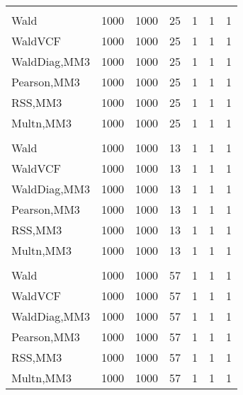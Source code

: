 \documentclass[
]{article}
\begin{document}
\begin{table}[H]
{\begin{tabular}[t]{lrrrrrr}
\addlinespace[0.3em]
\multicolumn{7}{l}{\textbf{1F 15V}}\\
\hspace{1em}Wald & 1000 & 1000 & 25 & 1 & 1 & 1\\
\hspace{1em}WaldVCF & 1000 & 1000 & 25 & 1 & 1 & 1\\
\hspace{1em}WaldDiag,MM3 & 1000 & 1000 & 25 & 1 & 1 & 1\\
\hspace{1em}Pearson,MM3 & 1000 & 1000 & 25 & 1 & 1 & 1\\
\hspace{1em}RSS,MM3 & 1000 & 1000 & 25 & 1 & 1 & 1\\
\hspace{1em}Multn,MM3 & 1000 & 1000 & 25 & 1 & 1 & 1\\
\addlinespace[0.3em]
\multicolumn{7}{l}{\textbf{2F 10V}}\\
\hspace{1em}Wald & 1000 & 1000 & 13 & 1 & 1 & 1\\
\hspace{1em}WaldVCF & 1000 & 1000 & 13 & 1 & 1 & 1\\
\hspace{1em}WaldDiag,MM3 & 1000 & 1000 & 13 & 1 & 1 & 1\\
\hspace{1em}Pearson,MM3 & 1000 & 1000 & 13 & 1 & 1 & 1\\
\hspace{1em}RSS,MM3 & 1000 & 1000 & 13 & 1 & 1 & 1\\
\hspace{1em}Multn,MM3 & 1000 & 1000 & 13 & 1 & 1 & 1\\
\addlinespace[0.3em]
\multicolumn{7}{l}{\textbf{3F 15V}}\\
\hspace{1em}Wald & 1000 & 1000 & 57 & 1 & 1 & 1\\
\hspace{1em}WaldVCF & 1000 & 1000 & 57 & 1 & 1 & 1\\
\hspace{1em}WaldDiag,MM3 & 1000 & 1000 & 57 & 1 & 1 & 1\\
\hspace{1em}Pearson,MM3 & 1000 & 1000 & 57 & 1 & 1 & 1\\
\hspace{1em}RSS,MM3 & 1000 & 1000 & 57 & 1 & 1 & 1\\
\hspace{1em}Multn,MM3 & 1000 & 1000 & 57 & 1 & 1 & 1\\
\bottomrule
\end{tabular}}
\endgroup{}
\end{table}
\end{document}
